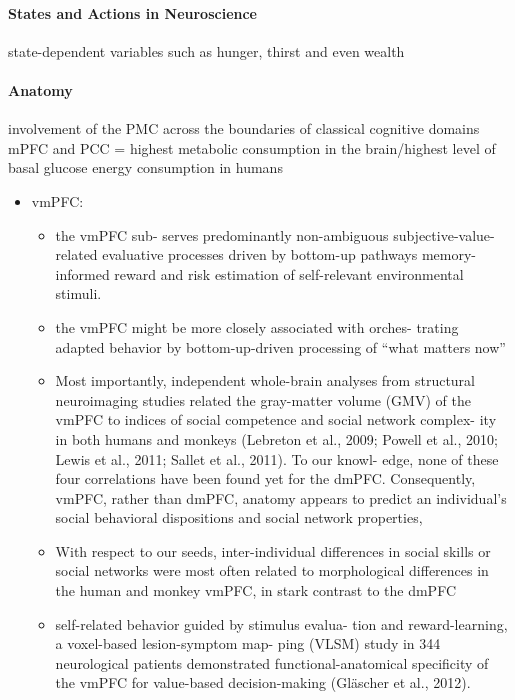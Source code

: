 \documentclass{article} %
\begin{document}
\paragraph{States and Actions in Neuroscience}


state-dependent variables such as hunger, thirst and
even wealth




\paragraph{Anatomy}
 involvement of the PMC across the boundaries of classical cognitive domains
mPFC and PCC = highest metabolic consumption in the brain/highest level of basal glucose energy consumption in humans

\begin{itemize}
  \item
    vmPFC:
    \begin{itemize}
    \item
the vmPFC sub- serves predominantly non-ambiguous subjective-value-related evaluative processes driven by bottom-up pathways
memory-informed reward and risk estimation of self-relevant environmental stimuli.
\item
the vmPFC might be more closely associated with orches- trating adapted behavior by bottom-up-driven processing of “what matters now”

\item
Most importantly, independent whole-brain analyses from structural neuroimaging studies related the gray-matter volume (GMV) of the vmPFC to indices of social competence and social network complex- ity in both humans and monkeys (Lebreton et al., 2009; Powell et al., 2010; Lewis et al., 2011; Sallet et al., 2011). To our knowl- edge, none of these four correlations have been found yet for the dmPFC. Consequently, vmPFC, rather than dmPFC, anatomy appears to predict an individual’s social behavioral dispositions and social network properties,

\item
With respect to our seeds, inter-individual differences in social skills or social networks were most often related to morphological differences in the human and monkey vmPFC, in stark contrast to the dmPFC

\item
self-related behavior guided by stimulus evalua- tion and reward-learning, a voxel-based lesion-symptom map- ping (VLSM) study in 344 neurological patients demonstrated functional-anatomical specificity of the vmPFC for value-based decision-making (Gläscher et al., 2012).



\end{itemize}
\end{itemize}
\end{document}

